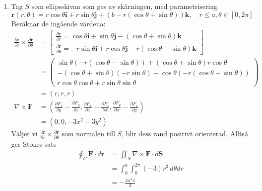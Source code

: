 \documentclass{article}
\renewcommand{\vec}[1]{\mathbf{#1}}
\begin{document}
\begin{enumerate}[label=\alph*)]
	\item Tag $S$ som ellipsskivan som ges av skärningen, med parametrisering
		$$ \vec r(r, \theta) = r \cos\theta \vec i + r \sin\theta \vec j + (b - r (\cos\theta + \sin\theta)) \vec k, \quad r \le a, \theta \in [0, 2\pi] $$
		Beräknar de ingående värdena:
		\begin{align*}
			\frac{\partial\vec r}{\partial r} \times \frac{\partial\vec r}{\partial\theta} &=
			\begin{bmatrix}
				\frac{\partial \vec r}{\partial r} = \cos\theta \vec i + \sin\theta \vec j - (\cos\theta + \sin\theta) \vec k \\
				\frac{\partial \vec r}{\partial \theta} = -r \sin\theta \vec i + r \cos\theta \vec j - r (\cos\theta - \sin\theta) \vec k
			\end{bmatrix} \\
			&= \begin{pmatrix}
				\sin\theta (-r (\cos\theta - \sin\theta)) + (\cos\theta + \sin\theta) r \cos\theta \\
				-(\cos\theta + \sin\theta) (-r \sin\theta) - \cos\theta (-r (\cos\theta - \sin\theta)) \\
				r \cos\theta \cos\theta + r \sin\theta \sin\theta
			\end{pmatrix} \\
			&= (r, r, r) \\
			\nabla \times \vec F &= \left(\frac{\partial F_z}{\partial y} - \frac{\partial F_y}{\partial z}, \frac{\partial F_x}{\partial z} - \frac{\partial F_z}{\partial x}, \frac{\partial F_y}{\partial x} - \frac{\partial F_x}{\partial y}\right) \\
			&= \left(0, 0, -3x^2 - 3y^2\right)
		\end{align*}
		Väljer vi $\frac{\partial \vec r}{\partial r} \times \frac{\partial \vec r}{\partial\theta}$ som normalen till $S$,
		blir dess rand positivt orienterad.
		Alltså ger Stokes sats
		\begin{align*}
			\oint_C \vec F \cdot d\vec r &= \iint_S \nabla \times \vec F \cdot d\vec S \\
				&= \int_0^a \int^{2\pi}_0 (-3) r^3 \, d\theta dr \\
				&= -\frac{3a^4\pi}2
		\end{align*}
\end{enumerate}
\end{document}
